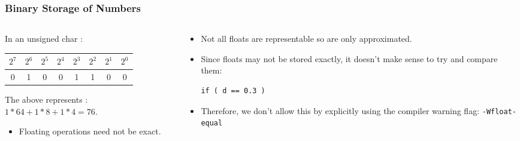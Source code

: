 
\begin{frame}[fragile]
\frametitle{Binary Storage of Numbers}

\begin{columns}

\begin{column}{0.45\textwidth}
In an unsigned char :
\begin{center}
\begin{tabular}{|c|c|c|c|c|c|c|c|}\hline
$2^7$ & $2^6$ & $2^5$ & $2^4$ & $2^3$ & $2^2$ & $2^1$ & $2^0$ \\ \hline
0     & 1     & 0     & 0     & 1     & 1     & 0     & 0     \\ \hline
\end{tabular}
\end{center}

The above represents : $1 * 64 + 1 * 8 + 1 * 4 = 76$.

\begin{itemize}[<+->]
\item Floating operations need not be exact.
\end{itemize}

\end{column}

\begin{column}{0.45\textwidth}
\begin{itemize}[<+->]
\item Not all floats are representable so are only approximated.
\item Since floats may not be stored exactly, it doesn't make sense to try and compare them:
\begin{lstlisting}[style=basicc,numbers=none]
if ( d == 0.3 )
\end{lstlisting}
\item Therefore, we don't allow this by explicitly using the compiler warning flag: {\tt -Wfloat-equal}
\end{itemize}
\end{column}

\end{columns}
\end{frame}


